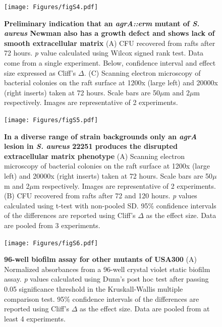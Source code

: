 \documentclass[10pt,letterpaper]{article}
\begin{document}
\begin{figure}[H]
\begin{adjustwidth}{-2.25in}{0in}
\texttt{[image: Figures/figS4.pdf]}
\caption[Preliminary indication that an \textit{agrA::erm} mutant of \textit{S. aureus} Newman also has a growth defect and shows lack of smooth extracellular matrix]{
\textbf{Preliminary indication that an \textit{agrA::erm} mutant of \textit{S. aureus} Newman also has a growth defect and shows lack of smooth extracellular matrix}
	(A) CFU recovered from rafts after 72 hours. \textit{p} value calculated using Wilcox signed rank test. Data come from a single experiment.
	Below, confidence interval and effect size expressed as Cliff's $\Delta$.
	(C) Scanning electron microscopy of bacterial colonies on the raft surface at 1200x (large left) and 20000x (right inserts) taken at 72 hours. Scale bars are 50$\mu$m and 2$\mu$m respectively. Images are representative of 2 experiments.}
        \label{figS4}
        \end{adjustwidth}
\end{figure}

\begin{figure}[H]
\begin{adjustwidth}{-2.25in}{0in}
\texttt{[image: Figures/figS5.pdf]}
\caption[In a diverse range of strain backgrounds only an \textit{agrA} lesion in \textit{S. aureus} 22251 produces the disrupted extracellular matrix phenotype]{
	\textbf{In a diverse range of strain backgrounds only an \textit{agrA} lesion in \textit{S. aureus} 22251 produces the disrupted extracellular matrix phenotype}
	(A) Scanning electron microscopy of bacterial colonies on the raft surface at 1200x (large left) and 20000x (right inserts) taken at 72 hours. Scale bars are 50$\mu$m and 2$\mu$m respectively. Images are representative of 2 experiments.
	(B) CFU recovered from rafts after 72 and 120 hours. \textit{p} values calculated using t-test with non-pooled SD. 95\% confidence intervals of the differences are reported using Cliff's $\Delta$ as the effect size. Data are pooled from 3 experiments.}
        \label{figS5}
        \end{adjustwidth}
\end{figure}

\begin{figure}[H]
\begin{adjustwidth}{-2.25in}{0in}
\texttt{[image: Figures/figS6.pdf]}
\caption[96-well biofilm assay for other mutants of USA300]{
	\textbf{96-well biofilm assay for other mutants of USA300}
	(A) Normalized absorbances from a 96-well crystal violet static biofilm assay. \textit{p} values calculated using Dunn's post hoc test after passing 0.05 significance threshold in the Kruskall-Wallis multiple comparison test. 95\% confidence intervals of the differences are reported using Cliff's $\Delta$ as the effect size. Data are pooled from at least 4 experiments.}
        \label{figS6}
        \end{adjustwidth}
\end{figure}
\end{document}
